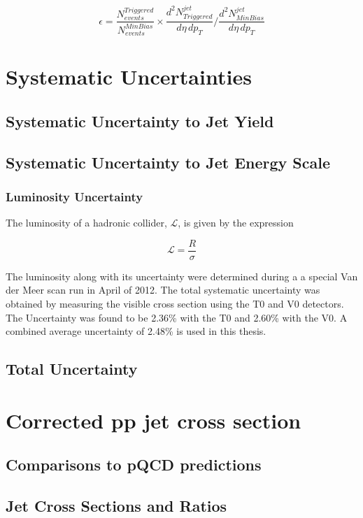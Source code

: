 \begin{equation}
	\epsilon = \frac{N^{Triggered}_{events}}{N^{MinBias}_{events}} \times \frac{d^{2} N_{Triggered}^{jet}}{d\eta \, dp_{T}} \Bigg/  \frac{d^{2} N_{MinBias}^{jet}}{d\eta \, dp_{T}} 
\label{eq:xsecdef}
\end{equation}

\section{Systematic Uncertainties}

\subsection{Systematic Uncertainty to Jet Yield}

\subsection{Systematic Uncertainty to Jet Energy Scale}

\subsubsection{Luminosity Uncertainty}

The luminosity of a hadronic collider, $\mathscr{L}$, is given by the expression



\begin{equation}
\mathscr{L} = \frac{R}{\sigma}
\label{eq:xlumdef}
\end{equation}

The luminosity along with its uncertainty were determined during a a special Van der Meer scan run in April of 2012\cite{ALICE-PUBLIC-2017-002}.  The total systematic uncertainty was obtained by measuring the visible cross section using the T0 and V0 detectors.  The Uncertainty was found to be 2.36\% with the T0 and 2.60\% with the V0.  A combined average uncertainty of 2.48\% is used in this thesis.

\subsection{Total Uncertainty}

\section{Corrected pp jet cross section}


\subsection{Comparisons to pQCD predictions}

\subsection{Jet Cross Sections and Ratios}




